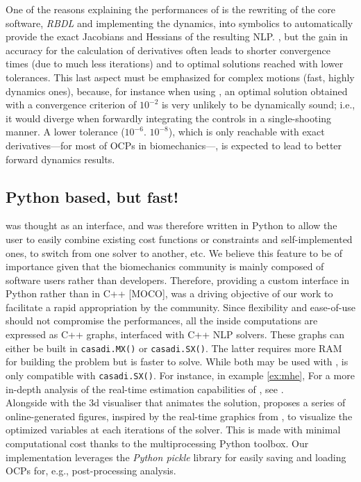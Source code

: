 One of the reasons explaining the performances of \bioptim is the rewriting of the core software, \textit{RBDL} and \biorbd implementing the dynamics, into \casadi symbolics to automatically provide the exact Jacobians and Hessians of the resulting NLP.  
, but the gain in accuracy for the calculation of derivatives often leads to shorter convergence times (due to much less iterations) and to optimal solutions reached with lower tolerances.
This last aspect must be emphasized for complex motions (fast, highly dynamics ones), because, for instance when using \ipopt, an optimal solution obtained with a convergence criterion of $10^{-2}$ is very unlikely to be dynamically sound; 
i.e., it would diverge when forwardly integrating the controls in a single-shooting manner. 
A lower tolerance ($10^{-6}$. $10^{-8}$), which is only reachable with exact derivatives---for most of OCPs in biomechanics---, is expected to lead to better forward dynamics results.

\subsection{Python based, but fast!}

\bioptim was thought as an interface, and was therefore written in Python to allow the user to easily combine existing cost functions or constraints and self-implemented ones, to switch from one solver to another, etc. 
We believe this feature to be of importance given that the biomechanics community is mainly composed of software users rather than developers.
Therefore, providing a custom interface in Python rather than in C++ [MOCO], was a driving objective of our work to facilitate a rapid appropriation by the community.
Since flexibility and ease-of-use should not compromise the performances, all the inside computations are expressed as C++ \casadi graphs, interfaced with C++ NLP solvers.
These graphs can either be built in \texttt{casadi.MX()} or \texttt{casadi.SX()}.
The latter requires more RAM for building the problem but is faster to solve.
While both may be used with \ipopt, \acados is only compatible with \texttt{casadi.SX()}.
For instance, in example \ref{ex:mhe}, 
For a more in-depth analysis of the real-time estimation capabilities of \bioptim, see \cite{bailly2020real}.\\
Alongside with the 3d visualiser \bioviz that animates the solution, \bioptim proposes a series of online-generated figures, inspired by the  real-time graphics from \muscodii \addref, to visualize the optimized variables at each iterations of the solver.
This is made with minimal computational cost thanks to the multiprocessing Python toolbox. 
Our implementation leverages the \textit{Python pickle} library for easily saving and loading OCPs for, e.g., post-processing analysis.


